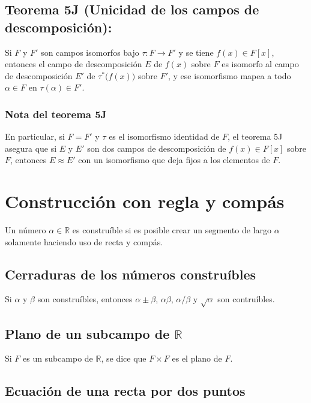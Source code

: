 \documentclass{article}
\begin{document}
\subsection*{\color{red} Teorema 5J (Unicidad de los campos de descomposición):}

Si $F$ y $F'$ son campos isomorfos bajo $\tau: F\to F'$ y se tiene $f(x)\in F[x]$, entonces el campo de descomposición $E$ de $f(x)$ sobre $F$ es isomorfo al campo de descomposición $E'$ de $\tau^{*}\big(f(x)\big)$ sobre $F'$, y ese isomorfismo mapea a todo $\alpha\in F$ en $\tau(\alpha)\in F'$.

\subsubsection*{\color{teal} Nota del teorema 5J}

En particular, si $F=F'$ y $\tau$ es el isomorfismo identidad de $F$, el teorema 5J asegura que si $E$ y $E'$ son dos campos de descomposición de $f(x)\in F[x]$ sobre $F$, entonces $E\approx E'$ con un isomorfismo que deja fijos a los elementos de $F$.

\newpage
\section{Construcción con regla y compás}

Un número $\alpha\in\mathbb{R}$ es construíble si es posible crear un segmento de largo $\alpha$ solamente haciendo uso de recta y compás.

\subsection*{\color{purple} Cerraduras de los números construíbles}

Si $\alpha$ y $\beta$ son construíbles, entonces $\alpha\pm\beta$, $\alpha\beta$, $\alpha/\beta$ y $\sqrt{\alpha}$ son contruíbles.

\subsection*{\color{violet} Plano de un subcampo de $\mathbb{R}$}

Si $F$ es un subcampo de $\mathbb{R}$, se dice que $F\times F$ es el plano de $F$.

\subsection*{\color{purple} Ecuación de una recta por dos puntos}
\end{document}
